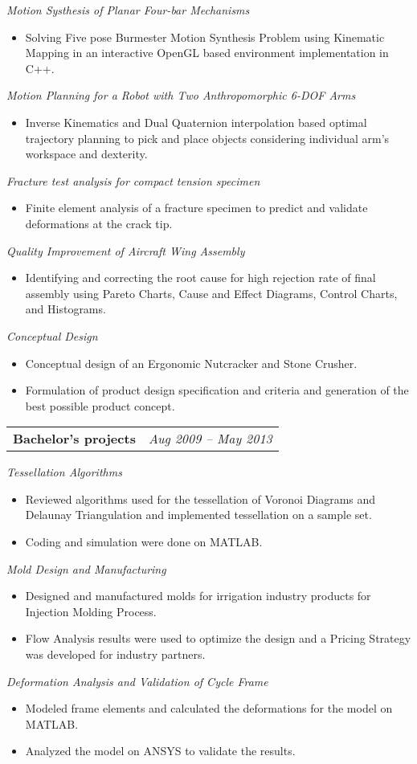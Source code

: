 \documentclass[letterpaper,10pt]{article}
\makeatletter
\newcommand{\resumeSubheading}[1]{
	\vspace{-3pt}
      {\small\textit{#1}} \\
      \vspace{-3pt}
}
\newcommand{\resumeHeadingwithDate}[2]{
	\vspace{-1pt}
	\begin{tabular*}{0.97\textwidth}{l@{\extracolsep{\fill}}r}
		\textbf{#1} &  \textit{\small#2} \vspace{-2pt}\\
	\end{tabular*}
	\vspace{+2pt}
}
\newcommand{\resumeItemListStart}{
\vspace{-7pt}
\begin{itemize}[leftmargin=14pt]
}
\newcommand{\resumeItemListEnd}{
\vspace{+7pt}
\end{itemize}
}
\newcommand{\resumeItem}[1]{
  \item\small{
      {#1 \vspace{-7pt}
      }
  }
}
\makeatother
\begin{document}
\resumeSubheading{Motion Systhesis of Planar Four-bar Mechanisms}
\resumeItemListStart
\resumeItem{Solving Five pose Burmester Motion Synthesis Problem using Kinematic Mapping in an interactive OpenGL based environment implementation in C++.}
\resumeItemListEnd

\resumeSubheading{Motion Planning for a Robot with Two Anthropomorphic 6-DOF Arms}
\resumeItemListStart
\resumeItem{Inverse Kinematics and Dual Quaternion interpolation based optimal trajectory planning to pick and place objects considering individual arm’s workspace and dexterity.}
\resumeItemListEnd

\resumeSubheading{Fracture test analysis for compact tension specimen}
\resumeItemListStart
\resumeItem{Finite element analysis of a fracture specimen to predict and validate deformations at the crack tip.}
\resumeItemListEnd

\resumeSubheading{Quality Improvement of Aircraft Wing Assembly}
\resumeItemListStart
\resumeItem{Identifying and correcting the root cause for high rejection rate of final assembly using Pareto Charts, Cause and Effect Diagrams, Control Charts, and Histograms.}
\resumeItemListEnd

\resumeSubheading{Conceptual Design}
\resumeItemListStart
\resumeItem{Conceptual design of an Ergonomic Nutcracker and Stone Crusher.}
\resumeItem{Formulation of product design specification and criteria and generation of the best possible product concept.}
\resumeItemListEnd


\resumeHeadingwithDate{Bachelor's projects}{Aug 2009 -- May 2013}
\resumeSubheading{Tessellation Algorithms}
\resumeItemListStart
\resumeItem{Reviewed algorithms used for the tessellation of Voronoi Diagrams and Delaunay Triangulation and implemented tessellation on a sample set.}
\resumeItem{Coding and simulation were done on MATLAB.}
\resumeItemListEnd

\resumeSubheading{Mold Design and Manufacturing}
\resumeItemListStart
\resumeItem{Designed and manufactured molds for irrigation industry products for Injection Molding Process.}
\resumeItem{Flow Analysis results were used to optimize the design and a Pricing Strategy was developed for industry partners.}
\resumeItemListEnd

\resumeSubheading{Deformation Analysis and Validation of Cycle Frame}
\resumeItemListStart
\resumeItem{Modeled frame elements and calculated the deformations for the model on MATLAB.}
\resumeItem{Analyzed the model on ANSYS to validate the results.}
\resumeItemListEnd
\end{document}
